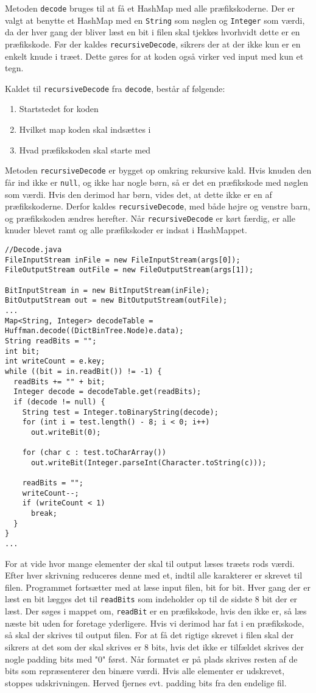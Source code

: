 \documentclass{article}
\begin{document}
Metoden \texttt{decode} bruges til at få et HashMap med alle præfikskoderne. Der er valgt at benytte et HashMap med en \texttt{String} som nøglen og \texttt{Integer} som værdi, da der hver gang der bliver læst en bit i filen skal tjekkes hvorhvidt dette er en præfikskode.
Før der kaldes \texttt{recursiveDecode}, sikrers der at der ikke kun er en enkelt knude i træet. Dette gøres for at koden også virker ved input med kun et tegn.

Kaldet til \texttt{recursiveDecode} fra \texttt{decode}, består af følgende: 
\begin{enumerate}
    \item Startstedet for koden
    \item Hvilket map koden skal indsættes i
    \item Hvad præfikskoden skal starte med
\end{enumerate}

Metoden \texttt{recursiveDecode} er bygget op omkring rekursive kald. Hvis knuden den får ind ikke er \texttt{null}, og ikke har nogle børn, så er det en præfikskode med nøglen som værdi. Hvis den derimod har børn, vides det, at dette ikke er en af præfikskoderne. Derfor kaldes \texttt{recursiveDecode}, med både højre og venstre barn, og præfikskoden ændres herefter.
Når \texttt{recursiveDecode} er kørt færdig, er alle knuder blevet ramt og alle præfikskoder er indsat i HashMappet.
\begin{lstlisting}
//Decode.java
FileInputStream inFile = new FileInputStream(args[0]);
FileOutputStream outFile = new FileOutputStream(args[1]);

BitInputStream in = new BitInputStream(inFile);
BitOutputStream out = new BitOutputStream(outFile);
...
Map<String, Integer> decodeTable = Huffman.decode((DictBinTree.Node)e.data);
String readBits = "";
int bit;
int writeCount = e.key;
while ((bit = in.readBit()) != -1) {
  readBits += "" + bit;
  Integer decode = decodeTable.get(readBits);
  if (decode != null) {
    String test = Integer.toBinaryString(decode);
    for (int i = test.length() - 8; i < 0; i++) 
      out.writeBit(0);	

    for (char c : test.toCharArray())
      out.writeBit(Integer.parseInt(Character.toString(c)));

    readBits = "";
    writeCount--;
    if (writeCount < 1) 
      break;
  }
}
...
\end{lstlisting}
For at vide hvor mange elementer der skal til output læses træets rods værdi. Efter hver skrivning reduceres denne med et, indtil alle karakterer er skrevet til filen.
Programmet fortsætter med at læse input filen, bit for bit. Hver gang der er læst en bit lægges det til \texttt{readBits} som indeholder op til de sidste 8 bit der er læst.
Der søges i mappet om, \texttt{readBit} er en præfikskode, hvis den ikke er, så læs næste bit uden for foretage yderligere. Hvis vi derimod har fat i en præfikskode, så skal der skrives til output filen.
For at få det rigtige skrevet i filen skal der sikrers at det som der skal skrives er 8 bits, hvis det ikke er tilfældet skrives der nogle padding bits med "0" først. Når formatet er på plads skrives resten af de bits som repræsenterer den binære værdi. Hvis alle elementer er udskrevet, stoppes udskrivningen. Herved fjernes evt. padding bits fra den endelige fil.
\newpage
\end{document}
